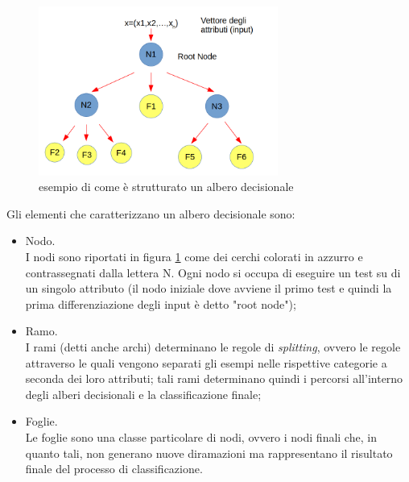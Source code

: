 \begin{figure} [h!]
	\centering
	\includegraphics[width=0.70\textwidth]{figs/schemaDT.png}
	\caption{esempio di come è strutturato un albero decisionale}
	\label{schemaDT}
\end{figure} 

Gli elementi che caratterizzano un albero decisionale sono:
\begin{itemize}
	\item Nodo. \\
	I nodi sono riportati in figura \ref{schemaDT} come dei cerchi colorati in azzurro e contrassegnati dalla lettera N. Ogni nodo si occupa di eseguire un test su di un singolo attributo (il nodo iniziale dove avviene il primo test e quindi la prima differenziazione degli input è detto "root node");
	\item Ramo. \\
	I rami (detti anche archi) determinano le regole di \textit{splitting}, ovvero le regole attraverso le quali vengono separati gli esempi nelle rispettive categorie a seconda dei loro attributi; tali rami determinano quindi i percorsi all'interno degli alberi decisionali e la classificazione finale;
	\item Foglie. \\
	Le foglie sono una classe particolare di nodi, ovvero i nodi finali che, in quanto tali, non generano nuove diramazioni ma rappresentano il risultato finale del processo di classificazione.
\end{itemize}

